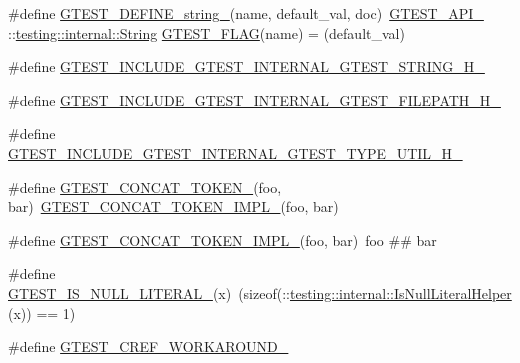 \begin{DoxyCompactItemize}
\item 
\#define \hyperlink{fused-src_2gtest_2gtest_8h_a885e18fe217a6e85553d408b99252c12}{\-G\-T\-E\-S\-T\-\_\-\-D\-E\-F\-I\-N\-E\-\_\-string\-\_\-}(name, default\-\_\-val, doc)~\hyperlink{gtest-port_8h_aa73be6f0ba4a7456180a94904ce17790}{\-G\-T\-E\-S\-T\-\_\-\-A\-P\-I\-\_\-} \-::\hyperlink{classtesting_1_1internal_1_1String}{testing\-::internal\-::\-String} \hyperlink{gtest__output__test___8cc_a448e05d56107d7550bea141e0f7a73d3}{\-G\-T\-E\-S\-T\-\_\-\-F\-L\-A\-G}(name) = (default\-\_\-val)
\item 
\#define \hyperlink{fused-src_2gtest_2gtest_8h_af7adda0fee2a48fec4d8628cbaedec76}{\-G\-T\-E\-S\-T\-\_\-\-I\-N\-C\-L\-U\-D\-E\-\_\-\-G\-T\-E\-S\-T\-\_\-\-I\-N\-T\-E\-R\-N\-A\-L\-\_\-\-G\-T\-E\-S\-T\-\_\-\-S\-T\-R\-I\-N\-G\-\_\-\-H\-\_\-}
\item 
\#define \hyperlink{fused-src_2gtest_2gtest_8h_aa6f5334cb6792f48ac5621193b41bb61}{\-G\-T\-E\-S\-T\-\_\-\-I\-N\-C\-L\-U\-D\-E\-\_\-\-G\-T\-E\-S\-T\-\_\-\-I\-N\-T\-E\-R\-N\-A\-L\-\_\-\-G\-T\-E\-S\-T\-\_\-\-F\-I\-L\-E\-P\-A\-T\-H\-\_\-\-H\-\_\-}
\item 
\#define \hyperlink{fused-src_2gtest_2gtest_8h_aff22afce4bffd0181c178e2e4d848c97}{\-G\-T\-E\-S\-T\-\_\-\-I\-N\-C\-L\-U\-D\-E\-\_\-\-G\-T\-E\-S\-T\-\_\-\-I\-N\-T\-E\-R\-N\-A\-L\-\_\-\-G\-T\-E\-S\-T\-\_\-\-T\-Y\-P\-E\-\_\-\-U\-T\-I\-L\-\_\-\-H\-\_\-}
\item 
\#define \hyperlink{fused-src_2gtest_2gtest_8h_ae3c336cbe1ae2bd1b1d019333e4428a0}{\-G\-T\-E\-S\-T\-\_\-\-C\-O\-N\-C\-A\-T\-\_\-\-T\-O\-K\-E\-N\-\_\-}(foo, bar)~\hyperlink{gtest-internal_8h_aa39fb5346d3573feebe4257cb3a01fde}{\-G\-T\-E\-S\-T\-\_\-\-C\-O\-N\-C\-A\-T\-\_\-\-T\-O\-K\-E\-N\-\_\-\-I\-M\-P\-L\-\_\-}(foo, bar)
\item 
\#define \hyperlink{fused-src_2gtest_2gtest_8h_aa39fb5346d3573feebe4257cb3a01fde}{\-G\-T\-E\-S\-T\-\_\-\-C\-O\-N\-C\-A\-T\-\_\-\-T\-O\-K\-E\-N\-\_\-\-I\-M\-P\-L\-\_\-}(foo, bar)~foo \#\# bar
\item 
\#define \hyperlink{fused-src_2gtest_2gtest_8h_ae5dd8e23090e08856613878fa1ff6fca}{\-G\-T\-E\-S\-T\-\_\-\-I\-S\-\_\-\-N\-U\-L\-L\-\_\-\-L\-I\-T\-E\-R\-A\-L\-\_\-}(x)~(sizeof(\-::\hyperlink{namespacetesting_1_1internal_a22c4be07d56f4f76ad08b35bfd40a685}{testing\-::internal\-::\-Is\-Null\-Literal\-Helper}(x)) == 1)
\item 
\#define \hyperlink{fused-src_2gtest_2gtest_8h_ac526c7e0df64d606e623de1a00cf73b7}{\-G\-T\-E\-S\-T\-\_\-\-C\-R\-E\-F\-\_\-\-W\-O\-R\-K\-A\-R\-O\-U\-N\-D\-\_\-}
\item 

\end{DoxyCompactItemize}
